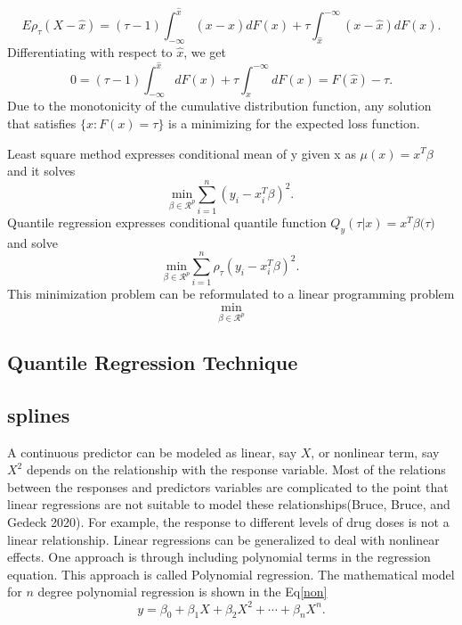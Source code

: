 \documentclass[
  12pt,
]{article}
\begin{document}
\[E\rho_{\tau}(X-\hat{x})=(\tau-1)\int_{-\infty}^{\hat{x}} (x-\hat{x})dF(x)+\tau\int_{\hat{x}}^{-\infty} (x-\hat{x})dF(x).\]
Differentiating with respect to \(\hat{x}\), we get
\[ 0  =(\tau-1)\int_{-\infty}^{\hat{x}} dF(x)+\tau\int_{\hat{x}}^{-\infty} dF(x)
=F(\hat{x})-\tau.\]
Due to the monotonicity of the cumulative distribution function, any solution that satisfies \(\{x:F(x)=\tau \}\) is a minimizing for the expected loss function.

Least square method expresses conditional mean of y given x as \(\mu(x)=x^T\beta\) and it solves \[ \underset{\beta\in \mathcal{R}^p}{\text{min}}\sum_{i=1}^n(y_i- x_i^T\beta)^2.\] Quantile regression expresses conditional quantile function \(Q_y(\tau|x)=x^T \beta ({\tau)}\) and solve \[ \underset{\beta\in \mathcal{R}^p}{\text{min}}\sum_{i=1}^n\rho_{\tau}(y_i- x_i^T\beta)^2.\]This minimization problem can be reformulated to a linear programming problem \[ \underset{\beta\in \mathcal{R}^p}{\text{min}} \]

\subsection{Quantile Regression Technique }

\subsection{splines}

A continuous predictor can be modeled as linear, say \(X\), or nonlinear term, say \(X^2\) depends on the relationship with the response variable. Most of the relations between the responses and predictors variables are complicated to the point that linear regressions are not suitable to model these relationships(Bruce, Bruce, and Gedeck 2020). For example, the response to different levels of drug doses is not a linear relationship. Linear regressions can be generalized to deal with nonlinear effects. One approach is through including polynomial terms in the regression equation. This approach is called Polynomial regression. The mathematical model for \(n\) degree polynomial regression is shown in the Eq\eqref{non}
\begin{equation}\label{non}
 y=\beta_0+\beta_1 X+\beta_2 X^2+\cdots+\beta_nX^n.
 \end{equation}
\end{document}
